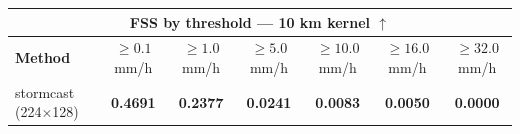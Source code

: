 \documentclass[border=10pt]{standalone}
\begin{document}
\begin{tabular}{lcccccc}
\toprule
\multicolumn{7}{c}{\textbf{FSS by threshold — 10 km kernel} $\uparrow$} \\
\midrule
\textbf{Method} & $\geq 0.1$ mm/h & $\geq 1.0$ mm/h & $\geq 5.0$ mm/h & $\geq 10.0$ mm/h & $\geq 16.0$ mm/h & $\geq 32.0$ mm/h \\
\midrule
stormcast (224$\times$128) & \textbf{0.4691} & \textbf{0.2377} & \textbf{0.0241} & \textbf{0.0083} & \textbf{0.0050} & \textbf{0.0000} \\
\bottomrule
\end{tabular}
\end{document}
